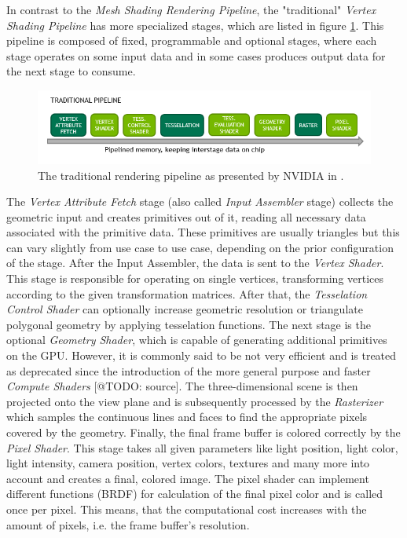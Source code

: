 In contrast to the \emph{Mesh Shading Rendering Pipeline}, the "traditional" \emph{Vertex Shading Pipeline} 
has more specialized stages, which are listed in figure \ref{fig:traditional-rendering-pipeline}. This pipeline 
is composed of fixed, programmable and optional stages, where each stage operates on some input data and in 
some cases produces output data for the next stage to consume.\\

\begin{figure}[h]
    \centering
    \includegraphics[width=\linewidth]{images/graphics/traditional-rendering-pipeline.png}
    \caption{The traditional rendering pipeline as presented by NVIDIA in \cite{Kubisch2018}.}
    \label{fig:traditional-rendering-pipeline}
\end{figure}

\noindent
The \emph{Vertex Attribute Fetch} stage (also called \emph{Input Assembler} stage) collects the geometric 
input and creates primitives out of it, reading all necessary data associated with the primitive data. 
These primitives are usually triangles but this can vary slightly from use case to use case, depending
on the prior configuration of the stage. After the Input Assembler, the data is sent to the \emph{Vertex Shader}.
This stage is responsible for operating on single vertices, transforming vertices according to the given 
transformation matrices. After that, the \emph{Tesselation Control Shader} can optionally increase geometric 
resolution or triangulate polygonal geometry by applying tesselation functions. The next stage is the optional 
\emph{Geometry Shader}, which is capable of generating additional primitives on the \ac{GPU}. However, it is 
commonly said to be not very efficient and is treated as deprecated since the introduction of the more general 
purpose and faster \emph{Compute Shaders} [@TODO: source]. The three-dimensional scene is then projected onto the 
view plane and is subsequently processed by the \emph{Rasterizer} which samples the continuous lines and faces to 
find the appropriate pixels covered by the geometry. Finally, the final frame buffer is colored correctly by the 
\emph{Pixel Shader}. This stage takes all given parameters like light position, light color, light intensity, camera 
position, vertex colors, textures and many more into account and creates a final, colored image. The pixel shader can 
implement different functions (\ac{BRDF}) for calculation of the final pixel color and is called once per pixel. 
This means, that the computational cost increases with the amount of pixels, i.e. the frame buffer's resolution. 


